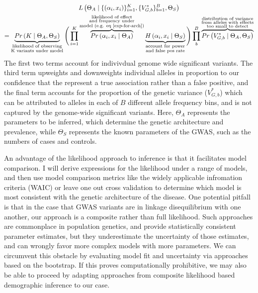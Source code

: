 \documentclass[11pt]{article}
\begin{document}
\begin{multline*}
  L\left(\Theta_A \mid \{\left(\alpha_i, x_i\right)\}_{i=1}^K , \{V^*_{G,b}\}_{b=1}^B, \Theta_S\right) \\ 
  = \underbrace{Pr\left(K \mid \Theta_A , \Theta_S \right)}_{\substack{\text{likelihood of observing} \\ \text{K variants under model}}} \Bigg( \prod_{i=1}^K \overbrace{Pr\left(\alpha_i , x_i \mid \Theta_A \right)}^{\substack{\text{likelihood of effect} \\ \text{and frequency under} \\ \text{model (e.g. eq \ref{exp-for-arch})}}} \underbrace{H\left(\alpha_i , x_i \mid \Theta_S\right)}_{\substack{\text{account for power} \\ \text{and false pos rate}}} \Bigg) \prod_b^B \overbrace{Pr\left(V^*_{G,b} \mid \Theta_A, \Theta_S \right)}^{\substack{\text{distribution of variance} \\ \text{from alleles with effects} \\ \text{too small to detect}}}
\end{multline*}
The first two terms account for indivivdual genome wide significant variants. The third term upweights and downweights individual alleles in proportion to our confidence that the represent a true association rather than a false positive, and the final term accounts for the proportion of the genetic variance ($V_{G,b}^*$) which can be attributed to alleles in each of $B$ different allele frequency bins, and is not captured by the genome-wide significant variants. Here, $\Theta_A$ represents the parameters to be inferred, which determine the genetic architecture and prevalence, while $\Theta_S$ represents the known parameters of the GWAS, such as the numbers of cases and controls. 

An advantage of the likelihood approach to inference is that it facilitates model comparison. I will derive expressions for the likelihood under a range of models, and then use model comparison metrics like the widely applicable infromation criteria (WAIC) or leave one out cross validation\cite{Vehtari:2016fm} to determine which model is most consistent with the genetic architecture of the disease. One potential pitfall is that in the case that GWAS variants are in linkage disequilibrium with one another, our approach is a composite rather than full likelihood. Such approaches are commonplace in population genetics, and provide statistically consistent parameter estimates\cite{Wiuf:2006bl}, but they underestimate the uncertainty of those estimates, and can wrongly favor more complex models with more parameters. We can circumvent this obstacle by evaluating model fit and uncertainty via approaches based on the bootstrap. If this proves computationally prohibitive, we may also be able to proceed by adapting approaches from composite likelihood based demographic inference\cite{Coffman:2015by} to our case.  
\end{document}
